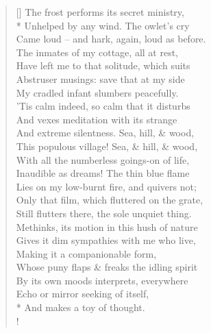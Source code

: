\documentclass[MAIN]{subfiles}
\begin{document}
\settowidth{\versewidth}{Came loud -- and hark, again, loud as before.}
\begin{verse}[\versewidth]
The frost performs its secret ministry,\\*
Unhelped by any wind. The owlet's cry\\
Came loud -- and hark, again, loud as before.\\
The inmates of my cottage, all at rest,\\
Have left me to that solitude, which suits\\
Abstruser musings: save that at my side\\
My cradled infant slumbers peacefully.\\
'Tis calm indeed, so calm that it disturbs\\
And vexes meditation with its strange\\
And extreme silentness. Sea, hill, \& wood,\\
This populous village! Sea, \& hill, \& wood,\\
With all the numberless goings-on of life,\\
Inaudible as dreams! The thin blue flame\\
Lies on my low-burnt fire, and quivers not;\\
Only that film, which fluttered on the grate,\\
Still flutters there, the sole unquiet thing.\\
Methinks, its motion in this hush of nature\\
Gives it dim sympathies with me who live,\\
Making it a companionable form,\\
Whose puny flaps \& freaks the idling spirit\\
By its own moods interprets, everywhere\\
Echo or mirror seeking of itself,\\*
And makes a toy of thought.\\!


\end{verse}
\end{document}
